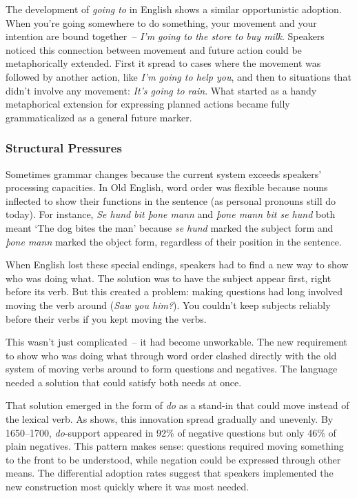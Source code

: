 The development of \textit{going to} in English shows a similar opportunistic adoption. When you're going somewhere to do something, your movement and your intention are bound together~-- \textit{I'm going to the store to buy milk}. Speakers noticed this connection between movement and future action could be metaphorically extended. First it spread to cases where the movement was followed by another action, like \textit{I'm going to help you}, and then to situations that didn't involve any movement: \textit{It's going to rain}. What started as a handy metaphorical extension for expressing planned actions became fully grammaticalized as a general future marker.

\subsubsection{Structural Pressures} 
Sometimes grammar changes because the current system exceeds speakers' processing capacities. In Old English, word order was flexible because nouns inflected to show their functions in the sentence (as personal pronouns still do today). For instance, \textit{Se hund bit þone mann} and \textit{þone mann bit se hund} both meant `The dog bites the man' because \textit{se hund} marked the subject form and \textit{þone mann} marked the object form, regardless of their position in the sentence.

When English lost these special endings, speakers had to find a new way to show who was doing what. The solution was to have the subject appear first, right before its verb. But this created a problem: making questions had long involved moving the verb around (\textit{Saw you him?}). You couldn't keep subjects reliably before their verbs if you kept moving the verbs.

This wasn't just complicated~-- it had become unworkable. The new requirement to show who was doing what through word order clashed directly with the old system of moving verbs around to form questions and negatives. The language needed a solution that could satisfy both needs at once.

That solution emerged in the form of \textit{do} as a stand-in that could move instead of the lexical verb. As \citet{culicover2008rise} shows, this innovation spread gradually and unevenly. By 1650--1700, \textit{do}-support appeared in 92\% of negative questions but only 46\% of plain negatives. This pattern makes sense: questions required moving something to the front to be understood, while negation could be expressed through other means. The differential adoption rates suggest that speakers implemented the new construction most quickly where it was most needed.

